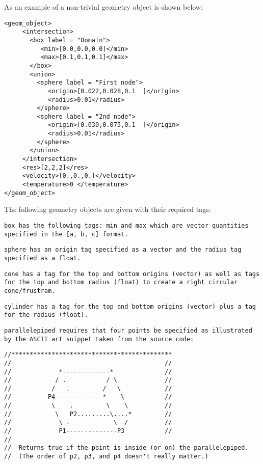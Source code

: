 As an example of a non-trivial geometry object is shown below:

\begin{Verbatim}[fontsize=\footnotesize]
<geom_object>
     <intersection>
       <box label = "Domain">
          <min>[0.0,0.0,0.0]</min>
          <max>[0.1,0.1,0.1]</max>
       </box>
       <union>
         <sphere label = "First node">
            <origin>[0.022,0.028,0.1  ]</origin>
            <radius>0.01</radius>
         </sphere>
         <sphere label = "2nd node">
            <origin>[0.030,0.075,0.1  ]</origin>
            <radius>0.01</radius>
         </sphere>
       </union>
     </intersection>
     <res>[2,2,2]</res>
     <velocity>[0.,0.,0.]</velocity>
     <temperature>0 </temperature>
</geom_object>
\end{Verbatim}

The following geometry objects are given with their required tags:

\tt box \normalfont has the following tags: min and max which are
vector quantities specified in the \tt [a, b, c] \normalfont format.

\tt sphere \normalfont has an origin tag specified as a vector and the
radius tag specified as a float.

\tt cone \normalfont has a tag for the top and bottom origins (vector)
as well as tags for the top and bottom radius (float) to create a
right circular cone/frustram.

\tt cylinder \normalfont has a tag for the top and bottom origins
(vector) plus a tag for the radius (float).

\tt parallelepiped \normalfont requires that four points be specified as
illustrated by the ASCII art snippet taken from the source code:

\begin{Verbatim}[fontsize=\footnotesize]
//********************************************
//                                          //
//             *-------------*              //
//            / .           / \             //
//           /   .         /   \            //
//          P4-------------*    \           //
//           \    .         \    \          //
//            \   P2.........\....*         //
//             \ .            \  /          //
//             P1--------------P3           //
//
//  Returns true if the point is inside (or on) the parallelepiped.
//  (The order of p2, p3, and p4 doesn't really matter.)
\end{Verbatim}

